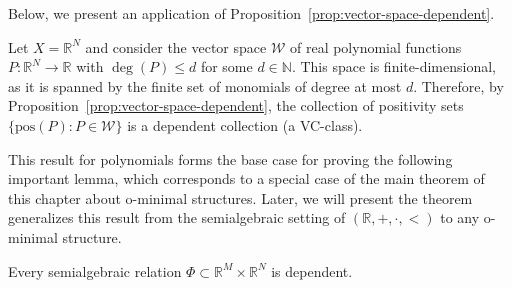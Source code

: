Below, we present an application of Proposition~\ref{prop:vector-space-dependent}.

\begin{example}
    Let $X = \mathbb{R}^N$ and consider the vector space $\mathcal{W}$ of real polynomial functions $P:\mathbb{R}^N \to \mathbb{R}$ with $\deg(P) \leq d$ for some $d \in \mathbb{N}$. This space is finite-dimensional, as it is spanned by the finite set of monomials of degree at most $d$. Therefore, by Proposition~\ref{prop:vector-space-dependent}, the collection of positivity sets $\{\text{pos}(P) : P \in \mathcal{W}\}$ is a dependent collection (a VC-class).
\end{example}

This result for polynomials forms the base case for proving the following important lemma, which corresponds to a special case of the main theorem of this chapter about o-minimal structures. Later, we will present the theorem generalizes this result from the semialgebraic setting of $(\mathbb{R}, +, \cdot, <)$ to any o-minimal structure.

\begin{lemma}
    \label{lem:semialgebraic-dependent}
    Every semialgebraic relation $\Phi \subset \mathbb{R}^M \times \mathbb{R}^N$ is dependent.
\end{lemma}

